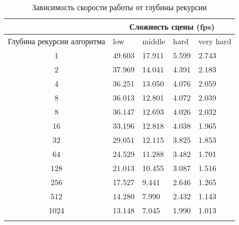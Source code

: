 \begin{center}
\begin{longtable}{|c|p{2cm}|p{2cm}|p{2cm}|p{2cm}|}
\hline & \multicolumn{4}{c|}{Сложность сцены (fps)} \\ 
\hline Глубина рекурсии алгоритма & low & middle & hard &  very hard\\ 
\hline 1 &  49.603 & 17.911 & 5.599 & 2.743 \\ 
\hline 2 &  37.969 & 14.041 & 4.391 & 2.183 \\ 
\hline 4 &  36.251 & 13.050 & 4.076 & 2.059 \\ 
\hline 8 &  36.013 & 12.801 & 4.072 & 2.039 \\ 
\hline 8 &  36.147 & 12.693 & 4.026 & 2.032 \\ 
\hline 16 &  33.196 & 12.818 & 4.038 & 1.965 \\ 
\hline 32 &  29.051 & 12.115 & 3.825 & 1.853 \\ 
\hline 64 &  24.529 & 11.288 & 3.482 & 1.701 \\ 
\hline 128 &  21.013 & 10.455 & 3.087 & 1.516 \\ 
\hline 256 &  17.527 & 9.441 & 2.646 & 1.265 \\ 
\hline 512 &  14.280 & 7.990 & 2.432 & 1.143 \\ 
\hline 1024 &  13.148 & 7.045 & 1.990 & 1.013 \\ 
\hline
\caption{Зависимость скорости работы от глубины рекурсии}\label{tab:performance_d}\end{longtable}
\end{center}

